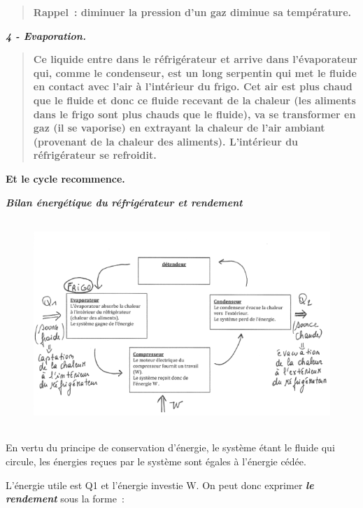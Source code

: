 \begin{quote}
\textbf{\textbf{Rappel~: diminuer la pression d'un gaz diminue sa
température.}}
\end{quote}

\textbf{\emph{\textbf{4 - Evaporation.}}}

\begin{quote}
\textbf{\textbf{Ce liquide entre dans le réfrigérateur et arrive dans
l'évaporateur qui, comme le condenseur, est un long serpentin qui met le
fluide en contact avec l'air à l'intérieur du frigo. Cet air est plus
chaud que le fluide et donc ce fluide recevant de la chaleur (les
aliments dans le frigo sont plus chauds que le fluide), va se
transformer en gaz (il se vaporise) en extrayant la chaleur de l'air
ambiant (provenant de la chaleur des aliments). L'intérieur du
réfrigérateur se refroidit.}}
\end{quote}

\textbf{}

\textbf{\textbf{Et le cycle recommence. }}

\textbf{}

\emph{\textbf{Bilan énergétique du réfrigérateur et rendement}}

\begin{figure}
\centering
\includegraphics[width=12.771cm,height=7.902cm]{Pictures/100000010000025300000171E55891644F01868A.png}
\caption{}
\end{figure}

En vertu du principe de conservation\textbf{ }d'énergie,\textbf{ }le
système étant le fluide qui circule, les énergies reçues par le système
sont égales à l'énergie cédée.

L'énergie utile est Q1 et l'énergie investie W. On peut donc exprimer
\emph{\textbf{le rendement}} sous la forme~:

